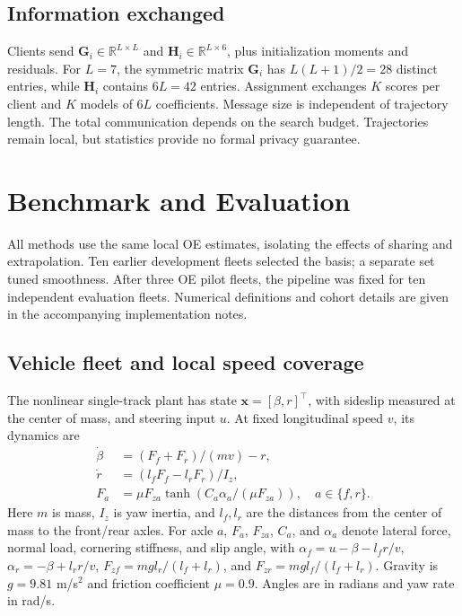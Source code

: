 \documentclass[conference]{IEEEtran}
\newcommand{\R}{\mathbb{R}}
\newcommand{\rev}[1]{\textcolor{revisiongreen}{#1}}
\newcommand{\focusrev}[1]{\textcolor{focusedrevision}{#1}}
\newcommand{\bs}[1]{\boldsymbol{#1}}
\begin{document}
\subsection{\rev{Information exchanged}}
\focusrev{Clients send $\bs{G}_i\in\R^{L\times L}$ and
$\bs{H}_i\in\R^{L\times6}$, plus initialization moments and residuals.
For $L=7$, the symmetric matrix $\bs{G}_i$ has $L(L+1)/2=28$ distinct
entries, while $\bs{H}_i$ contains $6L=42$ entries. Assignment exchanges $K$ scores
per client and $K$ models of $6L$ coefficients. Message size is independent
of trajectory length.
The total communication depends on the search budget.
Trajectories remain local, but statistics provide no formal privacy guarantee.}
\endgroup

\begingroup
\section{Benchmark and Evaluation}
\focusrev{All methods use the same local OE estimates, isolating the effects
of sharing and extrapolation.}
\focusrev{Ten earlier development fleets selected the basis; a separate set
tuned smoothness. After three OE pilot fleets, the pipeline was fixed for ten
independent evaluation fleets.
Numerical definitions and cohort details are given in the accompanying implementation notes.}

\subsection{Vehicle fleet and local speed coverage}
The \rev{nonlinear} single-track plant \rev{has} state $\bs{x}=[\beta,r]^\top$,
with sideslip measured at the center of mass, \rev{and steering input $u$}.
At fixed longitudinal speed $v$, its dynamics are
\begin{align}
 \dot\beta&=(F_f+F_r)/(mv)-r,\\
 \dot r&=(l_fF_f-l_rF_r)/I_z,\\
 F_a&=\mu F_{za}\tanh(C_a\alpha_a/(\mu F_{za})),\quad a\in\{f,r\}.
\end{align}
Here $m$ is mass, $I_z$ is yaw inertia, and $l_f,l_r$ are the distances
from the center of mass to the front/rear axles. For axle $a$, $F_a$,
$F_{za}$, $C_a$, and $\alpha_a$ denote lateral force, normal load,
cornering stiffness, and slip angle, with
$\alpha_f=u-\beta-l_fr/v$, $\alpha_r=-\beta+l_rr/v$,
$F_{zf}=mg l_r/(l_f+l_r)$, and $F_{zr}=mg l_f/(l_f+l_r)$.
Gravity is $g=9.81$ m/s$^2$ and friction coefficient $\mu=0.9$.
Angles are in radians and \rev{yaw rate} in rad/s.
\end{document}
